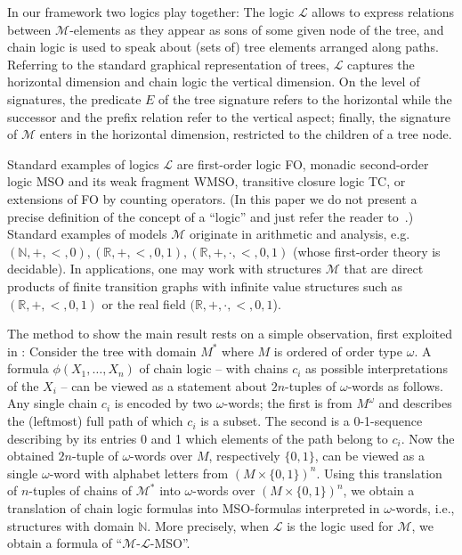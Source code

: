 \documentclass[copyright,creativecommons]{eptcs}
\theoremstyle{plain}
\theoremstyle{nonumberplain}
\newcommand{\m}{\ensuremath{\mathcal{M}}}
\newcommand{\el}{\ensuremath{\mathcal{L}}}
\newcommand{\ml}{\ensuremath{\m\textrm{-}\el}}
\begin{document}
In our framework two logics play together: The logic $\el$ 
allows to express relations between $\m$-elements as they appear as sons 
of some given node of the tree, and chain logic is used to speak about (sets of) 
tree elements arranged along paths. Referring to the standard graphical representation
of trees, $\el$ captures the horizontal dimension and chain logic the vertical 
dimension. On the level of signatures, the predicate $E$ of the tree signature
refers to the horizontal while the successor and the prefix relation refer to the vertical aspect; 
finally,  the signature of $\m$ enters in the horizontal dimension, restricted to the 
children of a tree node. 

Standard examples of logics $\el$ are first-order logic FO, monadic second-order logic MSO 
and its weak fragment WMSO, transitive closure logic TC, or extensions of FO by counting 
operators. (In this paper we do not present a precise definition of the concept of a ``logic'' and just refer the reader to~\cite{eft07}.) Standard examples of models $\m$ originate in arithmetic and analysis, e.g.\   
$(\mathbb{N}, +, <, 0), (\mathbb{R}, +, < , 0, 1), (\mathbb{R}, +, \cdot, <, 0,1)$ (whose
first-order theory is decidable). In 
applications, one may work with structures $\m$ that are 
direct products of finite transition graphs with infinite value structures such as 
 $ (\mathbb{R}, +, < , 0, 1)$ or the real field $(\mathbb{R}, +, \cdot, <, 0,1$). 

The method to show the main result rests on a simple observation, first exploited 
in \cite{tho90}: Consider the tree with domain $M^*$ where $M$ is ordered of order type $\omega$. 
A formula $\phi(X_1, \ldots, X_n)$ of chain logic -- with chains $c_i$ 
as possible interpretations of the $X_i$ -- can be viewed as a statement about 
$2n$-tuples of $\omega$-words as follows. 
Any single chain $c_i$ is encoded by two $\omega$-words; the 
first is from $M^\omega$ and describes the (leftmost) full path of which
$c_i$ is a subset. The second is a 0-1-sequence describing by its entries 0 and 1 
which elements of the path belong to $c_i$. Now the obtained  $2n$-tuple  of $\omega$-words 
over $M$, respectively $\{0,1\}$, can be viewed as a single $\omega$-word 
with alphabet letters from $(M \times \{0,1\})^n$. Using this translation 
of $n$-tuples of chains of $\m^*$ into $\omega$-words over $(M \times \{0,1\})^n$, 
we obtain a translation of 
chain logic formulas into MSO-formulas interpreted in $\omega$-words, i.e., 
structures with domain $\mathbb{N}$. More precisely, when $\el$ is the logic 
used for $\m$, we obtain a formula of ``\ml-MSO''. 
\end{document}

